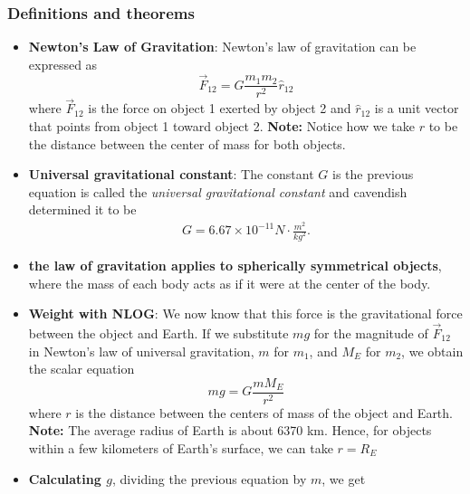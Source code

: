 \documentclass{report}
\begin{document}
    \subsubsection{Definitions and theorems}
    \begin{itemize}
        \item \textbf{Newton’s Law of Gravitation}:
            Newton's law of gravitation can be expressed as
            \begin{equation}
                \vec{F}_{12} = G \frac{m_1 m_2}{r^2} \hat{r}_{12}
            \end{equation}
            where $\vec{F}_{12}$ is the force on object 1 exerted by object 2 and $\hat{r}_{12}$ is a unit vector that points from object 1 toward object 2.
            \bigbreak \noindent 
            \bigbreak \noindent 
            \textbf{Note:} Notice how we take $r$ to be the distance between the center of mass for both objects.
        \item \textbf{Universal gravitational constant}: The constant $G$ is the previous equation is called the \textit{universal gravitational constant} and cavendish determined it to be 
            \begin{align*}
                G = 6.67 \times 10^{-11} N \cdot \frac{m^{2}}{kg^{2}}
            .\end{align*}
        \item \textbf{the law of gravitation applies to spherically symmetrical objects}, where the mass of each body acts as if it were at the center of the body.
        \item \textbf{Weight with NLOG}:
            We now know that this force is the gravitational force between the object and Earth. If we substitute $mg$ for the magnitude of $\vec{F}_{12}$ in Newton's law of universal gravitation, $m$ for $m_1$, and $M_E$ for $m_2$, we obtain the scalar equation
            \begin{equation}
                mg = G \frac{m M_E}{r^2}
            \end{equation}
            \bigbreak \noindent 
            where $r$ is the distance between the centers of mass of the object and Earth.
            \bigbreak \noindent 
            \textbf{Note:} The average radius of Earth is about 6370 km. Hence, for objects within a few kilometers of Earth’s surface, we can take $r=R_{E}$
        \item \textbf{Calculating $g$}, dividing the previous equation by $m$, we get
            \begin{equation}

\end{equation}
\end{itemize}
\end{document}

